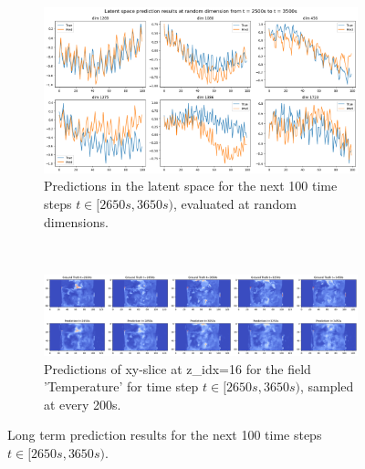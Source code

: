 \documentclass[final-report]{article-template}
\begin{document}
\begin{figure}[!htb]
    \centering
    \begin{subfigure}[t]{0.95\textwidth}
        \centering
        \includegraphics[width=\textwidth]{figures/long_term_100_latent.png}
        \caption{Predictions in the latent space for the next 100 time steps $t \in [2650s, 3650s)$, evaluated at random dimensions.}
    \end{subfigure} \\[8mm]
    \begin{subfigure}[t]{\textwidth}
        \centering
        \includegraphics[width=\textwidth]{figures/long_term_100.png}
        \caption{Predictions of xy-slice at z\_idx=16 for the field 'Temperature' for time step $t \in [2650s, 3650s)$, sampled at every 200s.}
    \end{subfigure}
    \caption{Long term prediction results for the next 100 time steps $t \in [2650s, 3650s)$.}
    \label{fig:pred_results_long_term}
\end{figure}

\end{document}
